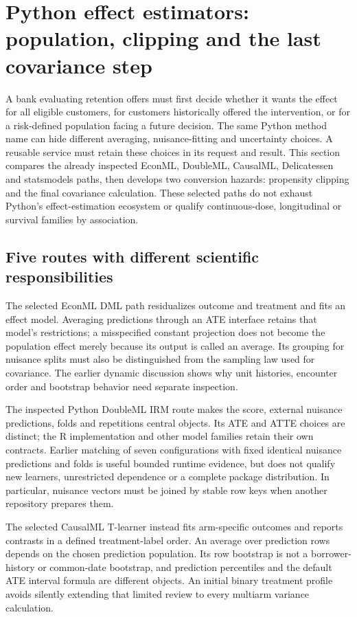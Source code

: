 \section{Python effect estimators: population, clipping and the last covariance step}
\label{exec20:pyfx-scope}
A bank evaluating retention offers must first decide whether it wants the
effect for all eligible customers, for customers historically offered the
intervention, or for a risk-defined population facing a future decision.
The same Python method name can hide different averaging, nuisance-fitting
and uncertainty choices. A reusable service must retain these choices in
its request and result. This section compares the already inspected EconML,
DoubleML, CausalML, Delicatessen and statsmodels paths, then develops two
conversion hazards: propensity clipping and the final covariance calculation.
These selected paths do not exhaust Python's effect-estimation ecosystem or
qualify continuous-dose, longitudinal or survival families by association.

\subsection{Five routes with different scientific responsibilities}
\label{exec20:pyfx-routes}
The selected EconML DML path residualizes outcome and treatment and fits an
effect model. Averaging predictions through an ATE interface retains that
model's restrictions; a misspecified constant projection does not become
the population effect merely because its output is called an average.
Its grouping for nuisance splits must also be distinguished from the
sampling law used for covariance. The earlier dynamic discussion shows why
unit histories, encounter order and bootstrap behavior need separate
inspection.\citep{exec19_econml_source}

The inspected Python DoubleML IRM route makes the score, external nuisance
predictions, folds and repetitions central objects. Its ATE and ATTE choices
are distinct; the R implementation and other model families retain their
own contracts. Earlier matching of seven configurations with fixed identical
nuisance predictions and folds is useful bounded runtime evidence, but does
not qualify new learners, unrestricted dependence or a complete package
distribution. In particular, nuisance vectors must be joined by stable row
keys when another repository prepares them.\citep{runtime_doubleml_scope}

The selected CausalML T-learner instead fits arm-specific outcomes and reports
contrasts in a defined treatment-label order. An average over prediction rows
depends on the chosen prediction population. Its row bootstrap is not a
borrower-history or common-date bootstrap, and prediction percentiles and
the default ATE interval formula are different objects. An initial binary
treatment profile avoids silently extending that limited review to every
multiarm variance calculation.\citep{exec14_causalml_primary}

